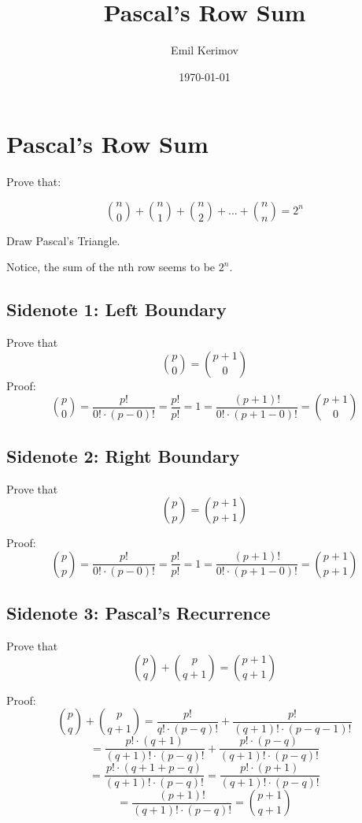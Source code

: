 \documentclass[a4paper]{article}
\title{Pascal's Row Sum}
\author{Emil Kerimov}
\date{\today}
\begin{document}
\maketitle
\section{Pascal's Row Sum}\label{pas:PascalRowSum}


Prove that:

$${n \choose 0} + {n \choose 1} +
{n \choose 2}+...+{n \choose n} =2^n$$


Draw Pascal's Triangle. 


Notice, the sum of the nth row seems to be $2^n$.


\subsection{Sidenote 1: Left Boundary}\label{pas:pascal_sidenote1}
Prove that $${p \choose 0}={p+1 \choose 0}$$
Proof:
$${p \choose 0}=\frac{p!}{0! \cdot (p-0)!}=\frac{p!}{p!}=1=\frac{(p+1)!}{0! \cdot (p+1-0)!}={p+1 \choose 0}$$

\subsection{Sidenote 2: Right Boundary}\label{pas:pascal_sidenote2}
Prove that $${p \choose p}={p+1 \choose p+1}$$

Proof:
$${p \choose p}=\frac{p!}{0! \cdot (p-0)!}=\frac{p!}{p!}=1=\frac{(p+1)!}{0! \cdot (p+1-0)!}={p+1 \choose p+1}$$

\subsection{Sidenote 3: Pascal's Recurrence}\label{pas:pascal_sidenote3}
Prove that $${p \choose q} +{p \choose q+1}={p+1 \choose q+1}$$

Proof:
$${p \choose q} +{p \choose q+1}=\frac{p!}{q! \cdot (p-q)!}+\frac{p!}{(q+1)! \cdot (p-q-1)!} $$
$$=\frac{p! \cdot (q+1)}{(q+1)! \cdot (p-q)!}+\frac{p! \cdot (p-q)}{(q+1)! \cdot (p-q)!} $$
$$= \frac{p! \cdot (q+1+p-q)}{(q+1)! \cdot (p-q)!} = \frac{p! \cdot (p+1)}{(q+1)! \cdot (p-q)!}$$
$$=\frac{(p+1)!}{(q+1)! \cdot (p-q)!}={p+1 \choose q+1} $$
\end{document}
